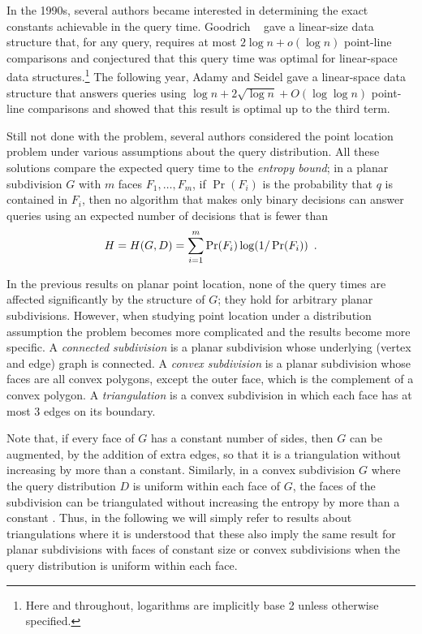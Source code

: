 \documentclass[lotsofwhite]{patmorin}
\begin{document}
In the 1990s, several authors became interested in determining the
exact constants achievable in the query time.  Goodrich \etal\
\cite{gor97} gave a linear-size data structure that, for any query,
requires at most $2\log n + o(\log n)$ point-line comparisons and
conjectured that this query time was optimal for linear-space data
structures.\footnote{Here and throughout, logarithms are implicitly base 2
unless otherwise specified.} The following year, Adamy and Seidel
\cite{as98} gave a linear-space data structure that answers queries
using $\log n + 2\sqrt{\log n} + O(\log\log n)$ point-line comparisons
and showed that this result is optimal up to the third term.

Still not done with the problem, several authors considered the point
location problem under various assumptions about the query
distribution.  All these solutions compare the expected query time to
the \emph{entropy bound};  in a planar subdivision $G$ with $m$ faces
$F_1,\ldots,F_m$, if $\Pr(F_i)$ is the probability that $q$ is
contained in $F_i$, then no algorithm that makes only binary decisions
can answer queries using an expected number of decisions that is fewer
than 
\begin{equation}
    H = H(G,D) = \sum_{i=1}^m \Pr(F_i)\log(1/\Pr(F_i)) \enspace . 
	\eqlabelx{entropy-face}
\end{equation}

In the previous results on planar point location, none of the query
times are affected significantly by the structure of $G$;  they hold
for arbitrary planar subdivisions.  However, when studying point
location under a distribution assumption the problem becomes more
complicated and the results become more specific.  A \emph{connected
subdivision} is a planar subdivision whose underlying (vertex and
edge) graph is connected.  A \emph{convex subdivision} is a planar
subdivision whose faces are all convex polygons, except the outer
face, which is the complement of a convex polygon.  A
\emph{triangulation} is a convex subdivision in which each face has at
most 3 edges on its boundary.

Note that, if every face of $G$ has a constant number of sides, then
$G$ can be augmented, by the addition of extra edges, so that it is a
triangulation without increasing \eqrefx{entropy-face} by more than a
constant.  Similarly, in a convex subdivision $G$ where the query
distribution $D$ is uniform within each face of $G$, the faces of the
subdivision can be triangulated without increasing the entropy by more
than a constant \cite{amm00}. Thus, in the following we will simply
refer to results about triangulations where it is understood that
these also imply the same result for planar subdivisions with faces of
constant size or convex subdivisions when the query distribution is
uniform within each face.
\end{document}
